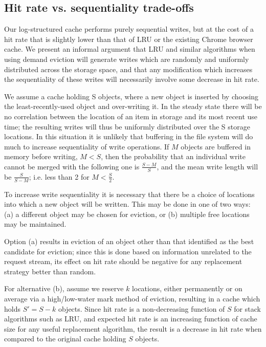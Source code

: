 \documentclass[letterpaper,twocolumn,10pt]{article}
\begin{document}
\subsection{Hit rate vs. sequentiality trade-offs}

Our log-structured cache performs purely sequential writes, but at the
cost of a hit rate that is slightly lower than that of LRU or the
existing Chrome browser cache. We present an informal argument that
LRU and similar algorithms when using demand eviction will generate
writes which are randomly and uniformly distributed across the storage
space, and that any modification which increases the sequentiality of
these writes will necessarily involve some decrease in hit rate.

We assume a cache holding S objects, where a new object is inserted by
choosing the least-recently-used object and over-writing it. In the
steady state there will be no correlation between the location of
an item in storage and its most recent use time; the resulting writes
will thus be uniformly distributed over the S storage locations.
In this situation it is unlikely that buffering in the file system
will do much to increase sequentiality of write operations.
If $M$ objects are buffered in memory before writing, $M<S$,
then the probability that an individual write cannot be merged with
the following one is $\frac{S-M}{S}$, and the mean write length will
be $\frac{S}{S-M}$; i.e. less than 2 for $M<\frac{S}{2}$.

To increase write sequentiality it is necessary that
there be a choice of locations into which a new object will be
written. This may be done in one of two ways: (a) a different object
may be chosen for eviction, or (b) multiple free locations may be
maintained.

Option (a) results in eviction of an object other than that identified
as the best candidate for eviction; since this is done based on
information unrelated to the request stream, its effect on hit rate
should be negative for any replacement strategy better than random.

For alternative (b), assume we reserve $k$ locations, either
permanently or on average via a high/low-water mark method of
eviction, resulting in a cache which holds $S'=S-k$ objects. Since hit
rate is a non-decreasing function of $S$ for stack algorithms such as
LRU, and expected hit rate is an increasing function of cache size for
any useful replacement algorithm, the result is a decrease in hit rate
when compared to the original cache holding $S$ objects. 
\end{document}
